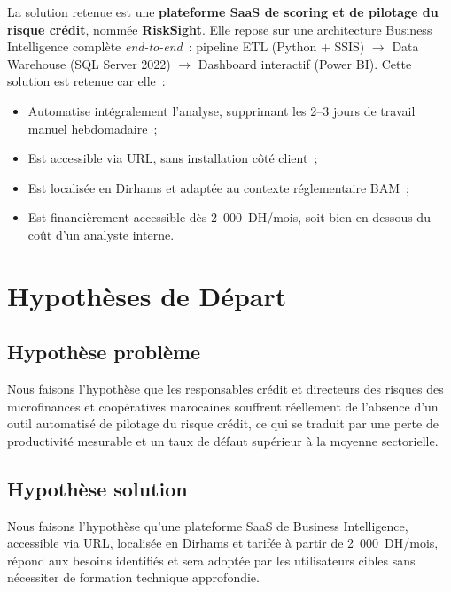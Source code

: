 \documentclass[12pt, a4paper]{report}
\begin{document}
La solution retenue est une \textbf{plateforme SaaS de scoring et de pilotage du
risque crédit}, nommée \textbf{RiskSight}. Elle repose sur une architecture Business
Intelligence complète \textit{end-to-end}~: pipeline ETL (Python + SSIS) $\to$
Data Warehouse (SQL Server 2022) $\to$ Dashboard interactif (Power BI). Cette
solution est retenue car elle~:

\begin{itemize}[leftmargin=1.5em]
  \item Automatise intégralement l'analyse, supprimant les 2--3 jours de travail
    manuel hebdomadaire~;
  \item Est accessible via URL, sans installation côté client~;
  \item Est localisée en Dirhams et adaptée au contexte réglementaire BAM~;
  \item Est financièrement accessible dès 2~000~DH/mois, soit bien en dessous
    du coût d'un analyste interne.
\end{itemize}

\newpage
\section{Hypothèses de Départ}

\subsection{Hypothèse problème}

\begin{tcolorbox}[warningbox,title={Hypothèse Problème}]
Nous faisons l'hypothèse que les responsables crédit et directeurs des risques des
microfinances et coopératives marocaines souffrent réellement de l'absence d'un
outil automatisé de pilotage du risque crédit, ce qui se traduit par une perte de
productivité mesurable et un taux de défaut supérieur à la moyenne sectorielle.
\end{tcolorbox}

\subsection{Hypothèse solution}

\begin{tcolorbox}[mybox,title={Hypothèse Solution}]
Nous faisons l'hypothèse qu'une plateforme SaaS de Business Intelligence, accessible
via URL, localisée en Dirhams et tarifée à partir de 2~000~DH/mois, répond aux
besoins identifiés et sera adoptée par les utilisateurs cibles sans nécessiter de
formation technique approfondie.
\end{tcolorbox}
\end{document}
